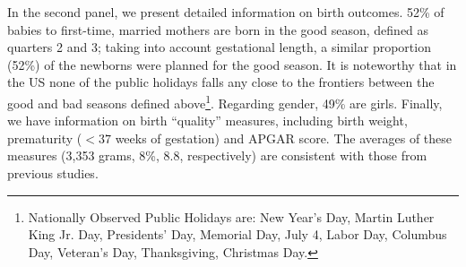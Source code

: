 \documentclass[a4paper, 11.5 pt]{article}
\theoremstyle{plain}
\begin{document}
\begin{doublespace}
In the second panel, we present detailed information on birth outcomes. 52\% of babies to first-time, married mothers are born in the good season, defined as quarters 2 and 3; taking into account gestational length, a similar proportion (52\%) of the newborns were planned for the good season. It is noteworthy that in the US none of the public holidays falls any close to the frontiers between the good and bad seasons defined above\footnote{Nationally Observed Public Holidays are: New Year's Day, Martin Luther King Jr. Day, Presidents' Day, Memorial Day, July 4, Labor Day, Columbus Day, Veteran's Day, Thanksgiving, Christmas Day.}. Regarding gender, 49\% are girls. Finally, we have information on birth ``quality'' measures, including birth weight, prematurity ($<37$ weeks of gestation) and APGAR score. The averages of these measures (3,353 grams, 8\%, 8.8, respectively) are consistent with those from previous studies.




\end{doublespace}
\end{document}
